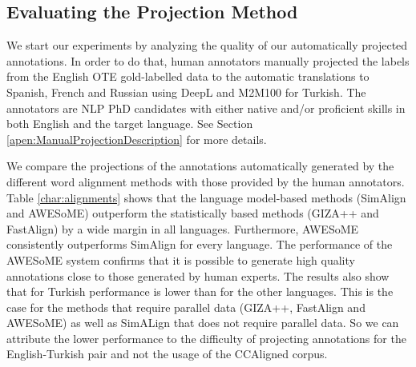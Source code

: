 \documentclass[11pt]{article}
\begin{document}
\subsection{Evaluating the Projection Method}\label{sec:ProjectionPerformance}

We start our experiments by analyzing the quality of our automatically projected annotations. In order to do that, human annotators manually projected the labels from the English OTE gold-labelled data to the automatic translations to Spanish, French and Russian using DeepL and M2M100 for Turkish. The annotators are NLP PhD candidates with either native and/or proficient skills in both English and the target language. See Section \ref{apen:ManualProjectionDescription} for more details. 

We compare the projections of the annotations automatically generated by the different word alignment methods with those provided by the human annotators. Table \ref{char:alignments} shows that the language model-based methods (SimAlign and AWESoME) outperform the statistically based methods (GIZA++ and FastAlign) by a wide margin in all languages. Furthermore, AWESoME consistently outperforms SimAlign for every language. The performance of the AWESoME system confirms that it is possible to generate high quality annotations close to those generated by human experts.
The results also show that for Turkish performance is lower than for the other languages. This is the case for the methods that require parallel data (GIZA++, FastAlign and AWESoME) as well as SimALign that does not require parallel data. So we can attribute the lower performance to the difficulty of projecting annotations for the English-Turkish pair and not the usage of the CCAligned corpus. 

\begin{table}[htbp]
  \centering
  \small
  \caption{OTE F1 score between the human annotation projections vs the automatic projections generated using different alignment models.}
  \label{char:alignments}
\end{table}
\end{document}
